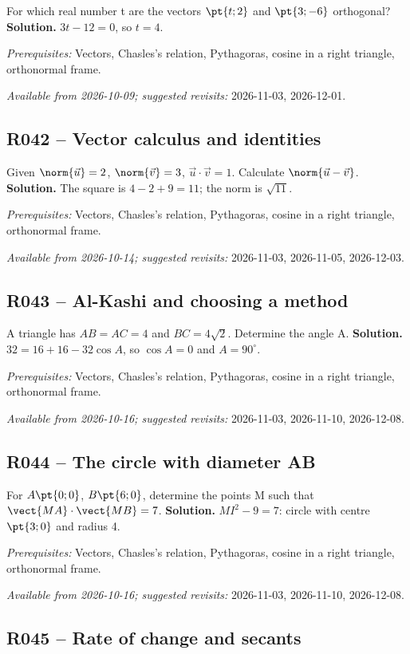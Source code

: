 For which real number t are the vectors $\pt{t;2}$ and $\pt{3;-6}$ orthogonal?
\ifmxteacher\textbf{Solution.} $3t-12=0$, so $t=4$.\par\textit{Prerequisites:} Vectors, Chasles's relation, Pythagoras, cosine in a right triangle, orthonormal frame.\par\textit{Available from 2026-10-09; suggested revisits:} 2026-11-03, 2026-12-01.\fi
{}\subsection*{R042 -- Vector calculus and identities}\label{R042}
Given $\norm{\vec u}=2$, $\norm{\vec v}=3$, $\vec u\cdot\vec v=1$. Calculate $\norm{\vec u-\vec v}$.
\ifmxteacher\textbf{Solution.} The square is $4-2+9=11$; the norm is $\sqrt{11}$.\par\textit{Prerequisites:} Vectors, Chasles's relation, Pythagoras, cosine in a right triangle, orthonormal frame.\par\textit{Available from 2026-10-14; suggested revisits:} 2026-11-03, 2026-11-05, 2026-12-03.\fi
{}\subsection*{R043 -- Al-Kashi and choosing a method}\label{R043}
A triangle has $AB=AC=4$ and $BC=4\sqrt2$. Determine the angle A.
\ifmxteacher\textbf{Solution.} $32=16+16-32\cos A$, so $\cos A=0$ and $A=90^\circ$.\par\textit{Prerequisites:} Vectors, Chasles's relation, Pythagoras, cosine in a right triangle, orthonormal frame.\par\textit{Available from 2026-10-16; suggested revisits:} 2026-11-03, 2026-11-10, 2026-12-08.\fi
{}\subsection*{R044 -- The circle with diameter AB}\label{R044}
For $A\pt{0;0}$, $B\pt{6;0}$, determine the points M such that $\vect{MA}\cdot\vect{MB}=7$.
\ifmxteacher\textbf{Solution.} $MI^2-9=7$: circle with centre $\pt{3;0}$ and radius 4.\par\textit{Prerequisites:} Vectors, Chasles's relation, Pythagoras, cosine in a right triangle, orthonormal frame.\par\textit{Available from 2026-10-16; suggested revisits:} 2026-11-03, 2026-11-10, 2026-12-08.\fi
{}\subsection*{R045 -- Rate of change and secants}\label{R045}
